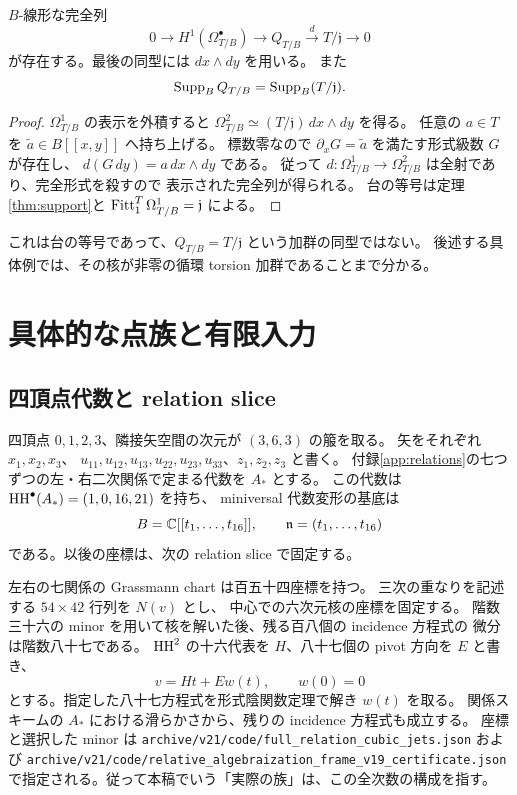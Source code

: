 \begin{proposition}\label{prop:omega2}
$B$-線形な完全列
\[
0\longrightarrow H^1(\Omega^\bullet_{T/B})
\longrightarrow Q_{T/B}\xrightarrow{\ d\ }
T/\mathfrak j\longrightarrow0
\]
が存在する。最後の同型には $dx\wedge dy$ を用いる。
また
\[
\operatorname{Supp}_BQ_{T/B}=\operatorname{Supp}_B(T/\mathfrak j).
\]
\end{proposition}

\begin{proof}
$\Omega^1_{T/B}$ の表示を外積すると
$\Omega^2_{T/B}\simeq(T/\mathfrak j)\,dx\wedge dy$ を得る。
任意の $a\in T$ を $\widetilde a\in B[[x,y]]$ へ持ち上げる。
標数零なので $\partial_xG=\widetilde a$ を満たす形式級数 $G$ が存在し、
$d(G\,dy)=a\,dx\wedge dy$ である。
従って $d:\Omega^1_{T/B}\to\Omega^2_{T/B}$ は全射であり、完全形式を殺すので
表示された完全列が得られる。
台の等号は定理\ref{thm:support}と
$\operatorname{Fitt}_1^T\Omega^1_{T/B}=\mathfrak j$ による。
\end{proof}

これは台の等号であって、$Q_{T/B}=T/\mathfrak j$ という加群の同型ではない。
後述する具体例では、その核が非零の循環 torsion 加群であることまで分かる。

\section{具体的な点族と有限入力}\label{sec:input}

\subsection{四頂点代数と relation slice}

四頂点 $0,1,2,3$、隣接矢空間の次元が $(3,6,3)$ の箙を取る。
矢をそれぞれ $x_1,x_2,x_3$、
$u_{11},u_{12},u_{13},u_{22},u_{23},u_{33}$、$z_1,z_2,z_3$ と書く。
付録\ref{app:relations}の七つずつの左・右二次関係で定まる代数を $A_*$ とする。
この代数は $\operatorname{HH}^\bullet(A_*)=(1,0,16,21)$ を持ち、
miniversal 代数変形の基底は
\[
 B=\mathbb C[[t_1,\ldots,t_{16}]],\qquad\mathfrak n=(t_1,\ldots,t_{16})
\]
である。以後の座標は、次の relation slice で固定する。

左右の七関係の Grassmann chart は百五十四座標を持つ。
三次の重なりを記述する $54\times42$ 行列を $N(v)$ とし、
中心での六次元核の座標を固定する。
階数三十六の minor を用いて核を解いた後、残る百八個の incidence 方程式の
微分は階数八十七である。
$\operatorname{HH}^2$ の十六代表を $H$、八十七個の pivot 方向を $E$ と書き、
\[
 v=Ht+Ew(t),\qquad w(0)=0
\]
とする。指定した八十七方程式を形式陰関数定理で解き $w(t)$ を取る。
関係スキームの $A_*$ における滑らかさから、残りの incidence 方程式も成立する。
座標と選択した minor は
\nolinkurl{archive/v21/code/full_relation_cubic_jets.json} および
\nolinkurl{archive/v21/code/relative_algebraization_frame_v19_certificate.json}
で指定される。従って本稿でいう「実際の族」は、この全次数の構成を指す。

